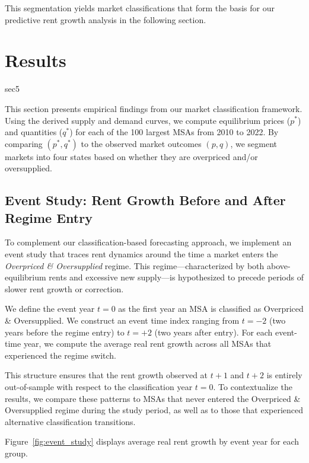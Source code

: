 \documentclass[APA,Times1COL]{WileyNJDv5} %
\begin{document}
This segmentation yields market classifications that form the basis for our predictive rent growth analysis in the following section.

\section{Results}{sec5}


This section presents empirical findings from our market classification framework. Using the derived supply and demand curves, we compute equilibrium prices (\( p^* \)) and quantities (\( q^* \)) for each of the 100 largest MSAs from 2010 to 2022. By comparing \( (p^*, q^*) \) to the observed market outcomes \( (p, q) \), we segment markets into four states based on whether they are overpriced and/or oversupplied.


\subsection{Event Study: Rent Growth Before and After Regime Entry}

To complement our classification-based forecasting approach, we implement an event study that traces rent dynamics around the time a market enters the \emph{Overpriced \& Oversupplied} regime. This regime—characterized by both above-equilibrium rents and excessive new supply—is hypothesized to precede periods of slower rent growth or correction.

We define the event year $t=0$ as the first year an MSA is classified as Overpriced \& Oversupplied. We construct an event time index ranging from $t = -2$ (two years before the regime entry) to $t = +2$ (two years after entry). For each event-time year, we compute the average real rent growth across all MSAs that experienced the regime switch.

This structure ensures that the rent growth observed at $t+1$ and $t+2$ is entirely out-of-sample with respect to the classification year $t=0$. To contextualize the results, we compare these patterns to MSAs that never entered the Overpriced \& Oversupplied regime during the study period, as well as to those that experienced alternative classification transitions.

Figure~\ref{fig:event_study} displays average real rent growth by event year for each group.
\end{document}
